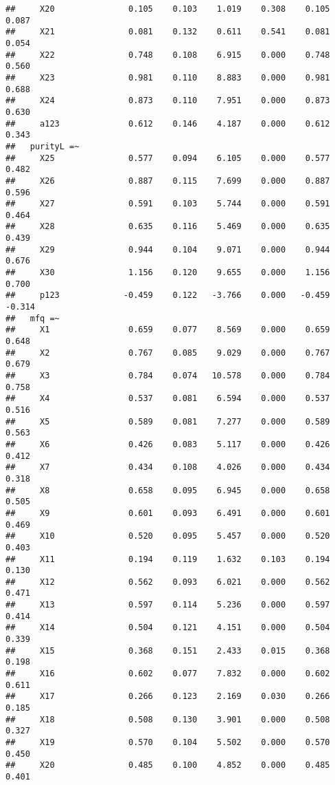 \documentclass[english,man]{apa6}
\theoremstyle{definition}
\theoremstyle{definition}
\theoremstyle{definition}
\theoremstyle{remark}
\begin{document}
\begin{verbatim}
##     X20               0.105    0.103    1.019    0.308    0.105    0.087
##     X21               0.081    0.132    0.611    0.541    0.081    0.054
##     X22               0.748    0.108    6.915    0.000    0.748    0.560
##     X23               0.981    0.110    8.883    0.000    0.981    0.688
##     X24               0.873    0.110    7.951    0.000    0.873    0.630
##     a123              0.612    0.146    4.187    0.000    0.612    0.343
##   purityL =~                                                            
##     X25               0.577    0.094    6.105    0.000    0.577    0.482
##     X26               0.887    0.115    7.699    0.000    0.887    0.596
##     X27               0.591    0.103    5.744    0.000    0.591    0.464
##     X28               0.635    0.116    5.469    0.000    0.635    0.439
##     X29               0.944    0.104    9.071    0.000    0.944    0.676
##     X30               1.156    0.120    9.655    0.000    1.156    0.700
##     p123             -0.459    0.122   -3.766    0.000   -0.459   -0.314
##   mfq =~                                                                
##     X1                0.659    0.077    8.569    0.000    0.659    0.648
##     X2                0.767    0.085    9.029    0.000    0.767    0.679
##     X3                0.784    0.074   10.578    0.000    0.784    0.758
##     X4                0.537    0.081    6.594    0.000    0.537    0.516
##     X5                0.589    0.081    7.277    0.000    0.589    0.563
##     X6                0.426    0.083    5.117    0.000    0.426    0.412
##     X7                0.434    0.108    4.026    0.000    0.434    0.318
##     X8                0.658    0.095    6.945    0.000    0.658    0.505
##     X9                0.601    0.093    6.491    0.000    0.601    0.469
##     X10               0.520    0.095    5.457    0.000    0.520    0.403
##     X11               0.194    0.119    1.632    0.103    0.194    0.130
##     X12               0.562    0.093    6.021    0.000    0.562    0.471
##     X13               0.597    0.114    5.236    0.000    0.597    0.414
##     X14               0.504    0.121    4.151    0.000    0.504    0.339
##     X15               0.368    0.151    2.433    0.015    0.368    0.198
##     X16               0.602    0.077    7.832    0.000    0.602    0.611
##     X17               0.266    0.123    2.169    0.030    0.266    0.185
##     X18               0.508    0.130    3.901    0.000    0.508    0.327
##     X19               0.570    0.104    5.502    0.000    0.570    0.450
##     X20               0.485    0.100    4.852    0.000    0.485    0.401

\end{verbatim}
\end{document}
